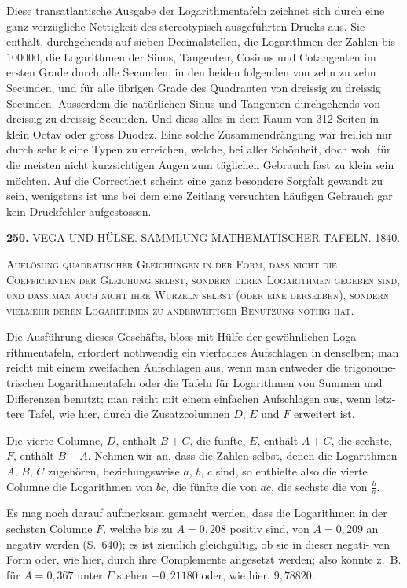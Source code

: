 \documentclass[12pt,a4paper]{article}
\begin{document}
\smallskip\noindent
Diese transatlantische Ausgabe der Logarithmentafeln zeichnet sich durch
eine ganz vorzügliche Nettigkeit des stereotypisch ausgeführten Drucks aus. Sie
enthält, durchgehends auf sieben Decimalstellen, die Logarithmen der Zahlen
bis $100000$, die Logarithmen der Sinus, Tangenten, Cosinus und Cotangenten
im ersten Grade durch alle Secunden, in den beiden folgenden von zehn zu zehn
Secunden, und für alle übrigen Grade des Quadranten von dreissig zu dreissig
Secunden. Ausserdem die natürlichen Sinus und Tangenten durchgehends von
dreissig zu dreissig Secunden. Und diess alles in dem Raum von 312 Seiten in
klein Octav oder gross Duodez. Eine solche Zusammendrängung war freilich nur
durch sehr kleine Typen zu erreichen, welche, bei aller Schönheit, doch wohl
für die meisten nicht kurzsichtigen Augen zum täglichen Gebrauch fast zu klein
sein möchten. Auf die Correctheit scheint eine ganz besondere Sorgfalt gewandt
zu sein, wenigstens ist uns bei dem eine Zeitlang versuchten häufigen Gebrauch
gar kein Druckfehler aufgestossen.

\newpage
\noindent\textbf{250.}\quad
VEGA UND HÜLSE. SAMMLUNG MATHEMATISCHER TAFELN. 1840.

\smallskip\noindent
\textsc{Auflösung quadratischer Gleichungen in der Form, dass nicht die Coefficienten
der Gleichung selbst, sondern deren Logarithmen gegeben sind, und dass man auch
nicht ihre Wurzeln selbst (oder eine derselben), sondern vielmehr deren Logarithmen
zu anderweitiger Benutzung nöthig hat.}

\smallskip\noindent
Die Ausführung dieses Geschäfts, bloss mit Hülfe der gewöhnlichen Loga-
rithmentafeln, erfordert nothwendig ein vierfaches Aufschlagen in denselben; man
reicht mit einem zweifachen Aufschlagen aus, wenn man entweder die trigonome-
trischen Logarithmentafeln oder die Tafeln für Logarithmen von Summen und
Differenzen benutzt; man reicht mit einem einfachen Aufschlagen aus, wenn letz-
tere Tafel, wie hier, durch die Zusatzcolumnen $D$, $E$ und $F$ erweitert ist.

\smallskip\noindent
Die vierte Columne, $D$, enthält $B+C$, die fünfte, $E$, enthält $A+C$,
die sechste, $F$, enthält $B-A$. Nehmen wir an, dass die Zahlen selbst, denen
die Logarithmen $A$, $B$, $C$ zugehören, beziehungsweise $a$, $b$, $c$ sind, so enthielte
also die vierte Columne die Logarithmen von $bc$, die fünfte die von $ac$, die
sechste die von $\frac{b}{a}$.

\smallskip\noindent
Es mag noch darauf aufmerksam gemacht werden, dass die Logarithmen in
der sechsten Columne $F$, welche bis zu $A = 0{,}208$ positiv sind, von $A = 0{,}209$
an negativ werden (S.~640); es ist ziemlich gleichgültig, ob sie in dieser negati-
ven Form oder, wie hier, durch ihre Complemente angesetzt werden; also könnte
z.~B. für $A=0{,}367$ unter $F$ stehen $-0{,}21180$ oder, wie hier, $9{,}78820$.
\end{document}
